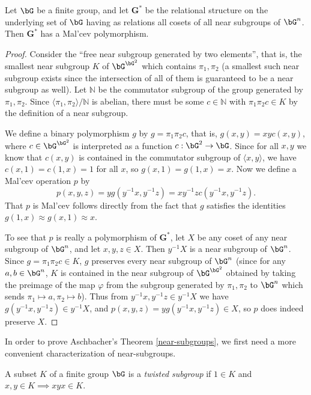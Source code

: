 \begin{cor} Let $\bG$ be a finite group, and let $\mathbf{G}^*$ be the relational structure on the underlying set of $\bG$ having as relations all cosets of all near subgroups of $\bG^n$. Then $\mathbf{G}^*$ has a Mal'cev polymorphism.
\end{cor}
\begin{proof} Consider the ``free near subgroup generated by two elements'', that is, the smallest near subgroup $K$ of $\bG^{\bG^2}$ which contains $\pi_1, \pi_2$ (a smallest such near subgroup exists since the intersection of all of them is guaranteed to be a near subgroup as well). Let $\mathbb{N}$ be the commutator subgroup of the group generated by $\pi_1, \pi_2$. Since $\langle \pi_1,\pi_2\rangle / \mathbb{N}$ is abelian, there must be some $c \in \mathbb{N}$ with $\pi_1\pi_2c \in K$ by the definition of a near subgroup.

We define a binary polymorphism $g$ by $g = \pi_1\pi_2c$, that is, $g(x,y) = xyc(x,y)$, where $c \in \bG^{\bG^2}$ is interpreted as a function $c : \bG^2 \rightarrow \bG$. Since for all $x,y$ we know that $c(x,y)$ is contained in the commutator subgroup of $\langle x, y\rangle$, we have $c(x,1) = c(1,x) = 1$ for all $x$, so $g(x,1) = g(1,x) = x$. Now we define a Mal'cev operation $p$ by
\[
p(x,y,z) = yg(y^{-1}x,y^{-1}z) = xy^{-1}zc(y^{-1}x,y^{-1}z).
\]
That $p$ is Mal'cev follows directly from the fact that $g$ satisfies the identities $g(1,x) \approx g(x,1) \approx x$.

To see that $p$ is really a polymorphism of $\mathbf{G}^*$, let $X$ be any coset of any near subgroup of $\bG^n$, and let $x,y,z \in X$. Then $y^{-1}X$ is a near subgroup of $\bG^n$. Since $g = \pi_1\pi_2c \in K$, $g$ preserves every near subgroup of $\bG^n$ (since for any $a,b \in \bG^n$, $K$ is contained in the near subgroup of $\bG^{\bG^2}$ obtained by taking the preimage of the map $\varphi$ from the subgroup generated by $\pi_1, \pi_2$ to $\bG^n$ which sends $\pi_1 \mapsto a, \pi_2 \mapsto b$). Thus from $y^{-1}x, y^{-1}z \in y^{-1}X$ we have $g(y^{-1}x,y^{-1}z) \in y^{-1}X$, and $p(x,y,z) = yg(y^{-1}x,y^{-1}z) \in X$, so $p$ does indeed preserve $X$.
\end{proof}

In order to prove Aschbacher's Theorem \ref{near-subgroups}, we first need a more convenient characterization of near-subgroups.

\begin{defn} A subset $K$ of a finite group $\bG$ is a \emph{twisted subgroup} if $1 \in K$ and $x,y \in K \implies xyx \in K$.
\end{defn}


